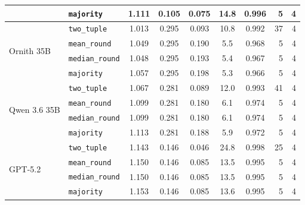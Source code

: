 \begin{table}[htbp]
\begin{tabular}{llcccccrr}
   & \texttt{majority} & 1.111 & 0.105 & 0.075 & 14.8 & 0.996 & 5 & 4 \\
\midrule
  \multirow{4}{*}{Ornith 35B} & \texttt{two\_tuple} & 1.013 & 0.295 & 0.093 & 10.8 & 0.992 & 37 & 4 \\
   & \texttt{mean\_round} & 1.049 & 0.295 & 0.190 & 5.5 & 0.968 & 5 & 4 \\
   & \texttt{median\_round} & 1.048 & 0.295 & 0.193 & 5.4 & 0.967 & 5 & 4 \\
   & \texttt{majority} & 1.057 & 0.295 & 0.198 & 5.3 & 0.966 & 5 & 4 \\
\midrule
  \multirow{4}{*}{Qwen 3.6 35B} & \texttt{two\_tuple} & 1.067 & 0.281 & 0.089 & 12.0 & 0.993 & 41 & 4 \\
   & \texttt{mean\_round} & 1.099 & 0.281 & 0.180 & 6.1 & 0.974 & 5 & 4 \\
   & \texttt{median\_round} & 1.099 & 0.281 & 0.180 & 6.1 & 0.974 & 5 & 4 \\
   & \texttt{majority} & 1.113 & 0.281 & 0.188 & 5.9 & 0.972 & 5 & 4 \\
\midrule
  \multirow{4}{*}{GPT-5.2} & \texttt{two\_tuple} & 1.143 & 0.146 & 0.046 & 24.8 & 0.998 & 25 & 4 \\
   & \texttt{mean\_round} & 1.150 & 0.146 & 0.085 & 13.5 & 0.995 & 5 & 4 \\
   & \texttt{median\_round} & 1.150 & 0.146 & 0.085 & 13.5 & 0.995 & 5 & 4 \\
   & \texttt{majority} & 1.153 & 0.146 & 0.085 & 13.6 & 0.995 & 5 & 4 \\
\bottomrule
\end{tabular}
\end{table}
